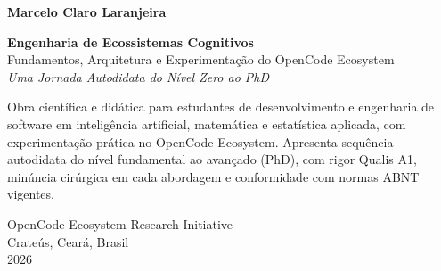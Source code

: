 \begin{folhaderosto}
    \centering
    
    {\large\bfseries Marcelo Claro Laranjeira}\par
    
    \vspace{5cm}
    
    {\Huge\bfseries\color{blue!60!black} Engenharia de Ecossistemas Cognitivos}\\[0.5cm]
    {\large Fundamentos, Arquitetura e Experimentação do OpenCode Ecosystem}\\[1cm]
    {\large\itshape Uma Jornada Autodidata do Nível Zero ao PhD}\par
    
    \vspace{3cm}
    
    \hfill
    \begin{minipage}{0.45\textwidth}
    \small
    Obra científica e didática para estudantes de desenvolvimento 
    e engenharia de software em inteligência artificial, matemática 
    e estatística aplicada, com experimentação prática no OpenCode 
    Ecosystem. Apresenta sequência autodidata do nível fundamental 
    ao avançado (PhD), com rigor Qualis A1, minúncia cirúrgica em 
    cada abordagem e conformidade com normas ABNT vigentes.
    \end{minipage}
    \par
    
    \vspace{3cm}
    
    \begin{flushright}
    {\small OpenCode Ecosystem Research Initiative}\\[0.1cm]
    {\small Crateús, Ceará, Brasil}\\[0.1cm]
    {\small 2026}
    \end{flushright}
    
    \vspace*{\fill}
\end{folhaderosto}
